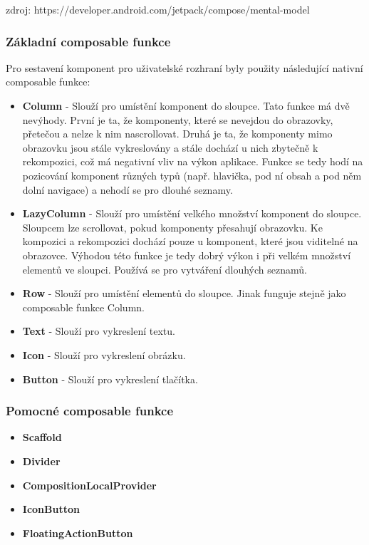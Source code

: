 \noindent zdroj:
https://developer.android.com/jetpack/compose/mental-model

\subsubsection*{Základní composable funkce}

\noindent Pro sestavení komponent pro uživatelské rozhraní byly použity následující nativní composable funkce:

\begin{itemize}
	\item \textbf{Column} - Slouží pro umístění  komponent do sloupce. Tato funkce má dvě nevýhody. První je ta, že komponenty, které se nevejdou do obrazovky, přetečou a nelze k nim nascrollovat. Druhá je ta, že komponenty mimo obrazovku jsou stále vykreslovány a stále dochází u nich zbytečně k rekompozici, což má negativní vliv na výkon aplikace. Funkce se tedy hodí na pozicování komponent různých typů (např. hlavička, pod ní obsah a pod něm dolní navigace) a nehodí se pro dlouhé seznamy.

	\item \textbf{LazyColumn} - Slouží pro umístění velkého množství komponent do sloupce. Sloupcem lze scrollovat, pokud komponenty přesahují obrazovku. Ke kompozici a rekompozici dochází pouze u komponent, které jsou viditelné na obrazovce. Výhodou této funkce je tedy dobrý výkon i při velkém množství elementů ve sloupci. Používá se pro vytváření dlouhých seznamů.

	\item \textbf{Row} - Slouží pro umístění  elementů do sloupce. Jinak funguje stejně jako composable funkce Column.

	\item \textbf{Text} - Slouží pro vykreslení textu.

	\item \textbf{Icon} - Slouží pro vykreslení obrázku.

	\item \textbf{Button} - Slouží pro vykreslení tlačítka. 
\end{itemize}

\subsubsection*{Pomocné composable funkce}

\begin{itemize}
	\item \textbf{Scaffold}
	\item \textbf{Divider}
	\item \textbf{CompositionLocalProvider}
	\item \textbf{IconButton}
	\item \textbf{FloatingActionButton}
\end{itemize}


